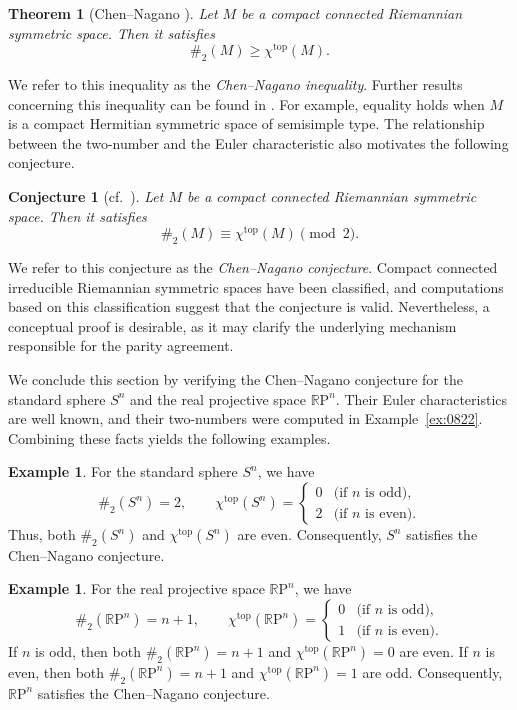 \documentclass[12pt]{amsart}
\newtheorem{Thm}[Prop]{Theorem}
\newtheorem{conj}[Prop]{Conjecture}
\theoremstyle{definition}
\newtheorem{Ex}[Prop]{Example}
\newcommand{\R}{{\mathbb R}}
\newcommand{\RP}{\R \mathrm{P}}
\begin{document}
\begin{Thm}[Chen--Nagano \cite{CN}]
Let $M$ be a compact connected Riemannian symmetric space. 
Then it satisfies 
\[
\#_2(M) \geq \chi^{\mathrm{top}}(M).
\]
\end{Thm}

We refer to this inequality as the \textit{Chen--Nagano inequality}.
Further results concerning this inequality can be found in \cite{CN}.
For example,
equality holds when $M$ is a compact Hermitian symmetric space of semisimple type.
The relationship between the two-number and the Euler characteristic
also motivates the following conjecture.

\begin{conj}[cf.\ \cite{Chen}]
Let $M$ be a compact connected Riemannian symmetric space.
Then it satisfies 
\[
\#_2(M) \equiv \chi^{\mathrm{top}}(M) \pmod{2}.
\]
\end{conj}

We refer to this conjecture as the \textit{Chen--Nagano conjecture}.
Compact connected irreducible Riemannian symmetric spaces have been classified,
and computations based on this classification suggest that the conjecture is valid.
Nevertheless,
a conceptual proof is desirable,
as it may clarify the underlying mechanism responsible for the parity agreement.

We conclude this section by verifying the Chen--Nagano conjecture
for the standard sphere $S^n$ and the real projective space $\RP^n$.
Their Euler characteristics are well known,
and their two-numbers were computed in Example~\ref{ex:0822}.
Combining these facts yields the following examples.

\begin{Ex}
For the standard sphere $S^n$, we have
\[
\#_2(S^n)=2,
\qquad
\chi^{\mathrm{top}}(S^n)
=
\begin{cases}
0 & \text{(if $n$ is odd)},\\
2 & \text{(if $n$ is even)}.
\end{cases}
\]
Thus, both $\#_2(S^n)$ and $\chi^{\mathrm{top}}(S^n)$ are even. 
Consequently, $S^n$ satisfies the Chen--Nagano conjecture. 
\end{Ex}

\begin{Ex}
For the real projective space $\RP^n$, we have
\[
\#_2(\RP^n)=n+1,
\qquad
\chi^{\mathrm{top}}(\RP^n)
=
\begin{cases}
0 & \text{(if $n$ is odd)},\\
1 & \text{(if $n$ is even)}.
\end{cases}
\] 
If $n$ is odd, then both $\#_2(\RP^n)=n+1$ and $\chi^{\mathrm{top}}(\RP^n)=0$ are even. 
If $n$ is even, then both $\#_2(\RP^n)=n+1$ and $\chi^{\mathrm{top}}(\RP^n)=1$ are odd. 
Consequently, $\RP^n$ satisfies the Chen--Nagano conjecture. 
\end{Ex}
\end{document}
